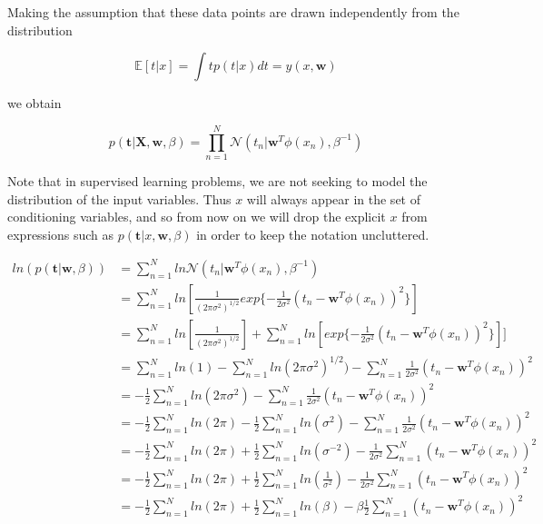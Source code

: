 Making the assumption that these data points are drawn independently from the distribution

\begin{equation}
    \mathbb{E}[t|x] = \int tp(t|x)dt = y(x, \pmb{w}) 
\end{equation}

we obtain

\begin{equation}
    p(\pmb{t} | \pmb{X}, \pmb{w}, \beta) = \prod_{n=1}^N \mathcal{N}(t_n | \pmb{w}^T \phi(x_n), \beta^{-1})
\end{equation}

Note that in supervised learning problems, we are not seeking to model the distribution of the input variables. Thus $x$ will always appear in the set of conditioning variables, and so from now on we will drop the explicit $x$ from expressions such as $p(\pmb{t}|x, \pmb{w}, \beta)$ in order to keep the notation uncluttered.

\begin{equation}
    \begin{split}
        ln (p(\pmb{t} | \pmb{w}, \beta)) & = \sum_{n=1}^N ln \mathcal{N}(t_n| \pmb{w}^T \phi(x_n), \beta^{-1})\\
        & = \sum_{n=1}^N ln [ \frac{1}{(2\pi \sigma^2)^{1/2}} exp \{ - \frac{1}{2\sigma^2} (t_n - \pmb{w}^T \phi (x_n))^2\}]\\
        & = \sum_{n=1}^N ln [ \frac{1}{(2\pi \sigma^2)^{1/2}}] + \sum_{n=1}^N ln[exp \{ - \frac{1}{2\sigma^2} (t_n - \pmb{w}^T \phi (x_n))^2\}]]\\
        & = \sum_{n=1}^N ln (1) - \sum_{n=1}^N ln(2\pi \sigma^2)^{1/2}) - \sum_{n=1}^N \frac{1}{2\sigma^2} (t_n - \pmb{w}^T \phi (x_n))^2\\
        & = - \frac{1}{2}\sum_{n=1}^N ln(2\pi \sigma^2) - \sum_{n=1}^N \frac{1}{2\sigma^2} (t_n - \pmb{w}^T \phi (x_n))^2\\
        & = - \frac{1}{2}\sum_{n=1}^N ln(2\pi) - \frac{1}{2}\sum_{n=1}^N ln(\sigma^2) - \sum_{n=1}^N \frac{1}{2\sigma^2} (t_n - \pmb{w}^T \phi (x_n))^2\\
        & = - \frac{1}{2}\sum_{n=1}^N ln(2\pi) + \frac{1}{2}\sum_{n=1}^N ln(\sigma^{-2}) - \frac{1}{2\sigma^2}\sum_{n=1}^N (t_n - \pmb{w}^T \phi (x_n))^2\\
        & = - \frac{1}{2}\sum_{n=1}^N ln(2\pi) + \frac{1}{2}\sum_{n=1}^N ln(\frac{1}{\sigma^{2}}) - \frac{1}{2\sigma^2}\sum_{n=1}^N (t_n - \pmb{w}^T \phi (x_n))^2\\
        & = - \frac{1}{2}\sum_{n=1}^N ln(2\pi) + \frac{1}{2}\sum_{n=1}^N ln(\beta) - \beta\frac{1}{2}\sum_{n=1}^N (t_n - \pmb{w}^T \phi (x_n))^2\\
    \end{split}
\end{equation}

